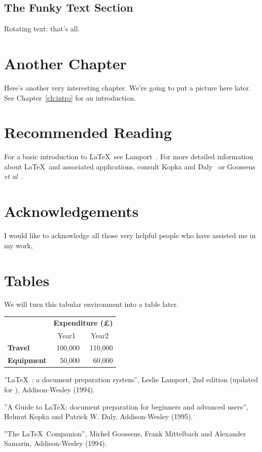 \documentclass[12pt]{scrbook}
\begin{document}
\section{The Funky Text Section}
Rotating text: 
that's all.


\chapter{Another Chapter}
\label{ch:another}

Here's another very interesting chapter.
We're going to put a picture here later.
See Chapter~\ref{ch:intro} for an introduction.

\chapter{Recommended Reading}
For a basic introduction to \LaTeX\ see Lamport~\cite{lamport94}. For more
detailed information about \LaTeX\ and associated applications, consult
Kopka and Daly~\cite{kopka95} or Goossens \emph{et al}~\cite{goossens94}.

\chapter*{Acknowledgements}

I would like to acknowledge all those
very helpful people who have assisted me in my work,

\appendix

\chapter{Tables}
We will turn this tabular environment into a table later.

\begin{tabular}{lrr}
                     & \multicolumn{2}{c}{\bfseries Expenditure (\pounds)} \\
                     & \multicolumn{1}{c}{Year1} & \multicolumn{1}{c}{Year2} \\
 \bfseries Travel    & 100,000 & 110,000 \\
 \bfseries Equipment & 50,000  & 60,000
\end{tabular}

\begin{thebibliography}{Goossens 1994}
     ''\LaTeX\ : a document preparation system'',
    Leslie Lamport, 2nd edition (updated for \LaTeXe), Addison-Wesley (1994).

     ''A Guide to \LaTeX: document preparation for
    beginners and advanced users'', Helmut Kopka and Patrick W. Daly, 
    Addison-Wesley (1995).

     ''The \LaTeX\ Companion'', Michel Goossens,
    Frank Mittelbach and Alexander Samarin, Addison-Wesley (1994).
\end{thebibliography}
\end{document}
